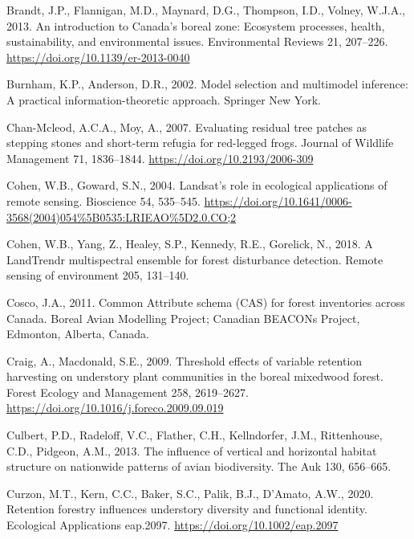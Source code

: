 \documentclass[
  12pt,
]{article}
\newlength{\cslhangindent}
\newlength{\cslentryspacingunit} %
\newenvironment{CSLReferences}[2] %
 {%
  \setlength{\parindent}{0pt}
  \ifodd #1
  \let\oldpar\par
  \def\par{\hangindent=\cslhangindent\oldpar}
  \fi
  \setlength{\parskip}{#2\cslentryspacingunit}
 }%
 {}
\begin{document}
\begin{CSLReferences}{1}{0}
\leavevmode{}%
Brandt, J.P., Flannigan, M.D., Maynard, D.G., Thompson, I.D., Volney, W.J.A., 2013. An introduction to {Canada}'s boreal zone: {Ecosystem} processes, health, sustainability, and environmental issues. Environmental Reviews 21, 207--226. \url{https://doi.org/10.1139/er-2013-0040}

\leavevmode{}%
Burnham, K.P., Anderson, D.R., 2002. Model selection and multimodel inference: {A} practical information-theoretic approach. Springer New York.

\leavevmode{}%
Chan-Mcleod, A.C.A., Moy, A., 2007. Evaluating residual tree patches as stepping stones and short-term refugia for red-legged frogs. Journal of Wildlife Management 71, 1836--1844. \url{https://doi.org/10.2193/2006-309}

\leavevmode{}%
Cohen, W.B., Goward, S.N., 2004. Landsat's role in ecological applications of remote sensing. Bioscience 54, 535--545. \url{https://doi.org/10.1641/0006-3568(2004)054\%5B0535:LRIEAO\%5D2.0.CO;2}

\leavevmode{}%
Cohen, W.B., Yang, Z., Healey, S.P., Kennedy, R.E., Gorelick, N., 2018. A {LandTrendr} multispectral ensemble for forest disturbance detection. Remote sensing of environment 205, 131--140.

\leavevmode{}%
Cosco, J.A., 2011. Common {Attribute} schema ({CAS}) for forest inventories across {Canada}. Boreal Avian Modelling Project; Canadian BEACONs Project, Edmonton, Alberta, Canada.

\leavevmode{}%
Craig, A., Macdonald, S.E., 2009. Threshold effects of variable retention harvesting on understory plant communities in the boreal mixedwood forest. Forest Ecology and Management 258, 2619--2627. \url{https://doi.org/10.1016/j.foreco.2009.09.019}

\leavevmode{}%
Culbert, P.D., Radeloff, V.C., Flather, C.H., Kellndorfer, J.M., Rittenhouse, C.D., Pidgeon, A.M., 2013. The influence of vertical and horizontal habitat structure on nationwide patterns of avian biodiversity. The Auk 130, 656--665.

\leavevmode{}%
Curzon, M.T., Kern, C.C., Baker, S.C., Palik, B.J., D'Amato, A.W., 2020. Retention forestry influences understory diversity and functional identity. Ecological Applications eap.2097. \url{https://doi.org/10.1002/eap.2097}


\end{CSLReferences}
\end{document}
